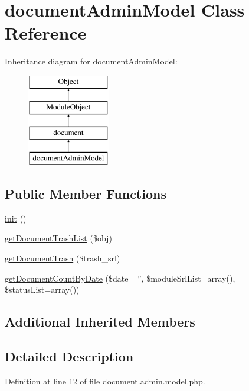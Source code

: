 \hypertarget{classdocumentAdminModel}{\section{document\-Admin\-Model Class Reference}
\label{classdocumentAdminModel}
}
Inheritance diagram for document\-Admin\-Model\-:\begin{figure}[H]
\begin{center}
\leavevmode
\includegraphics[height=4.000000cm]{classdocumentAdminModel}
\end{center}
\end{figure}
\subsection*{Public Member Functions}
\begin{DoxyCompactItemize}
\item 
\hyperlink{classdocumentAdminModel_aa2d2c19a8a236499b03c085bbf578c11}{init} ()
\item 
\hyperlink{classdocumentAdminModel_a2dde1d3304ebc18a52a841aee71b4fad}{get\-Document\-Trash\-List} (\$obj)
\item 
\hyperlink{classdocumentAdminModel_a4cff1ba3f56281a915059ecdbcdfd740}{get\-Document\-Trash} (\$trash\-\_\-srl)
\item 
\hyperlink{classdocumentAdminModel_af678afbc6a4c06e1913f30755a370ab0}{get\-Document\-Count\-By\-Date} (\$date= '', \$module\-Srl\-List=array(), \$status\-List=array())
\end{DoxyCompactItemize}
\subsection*{Additional Inherited Members}


\subsection{Detailed Description}


Definition at line 12 of file document.\-admin.\-model.\-php.




